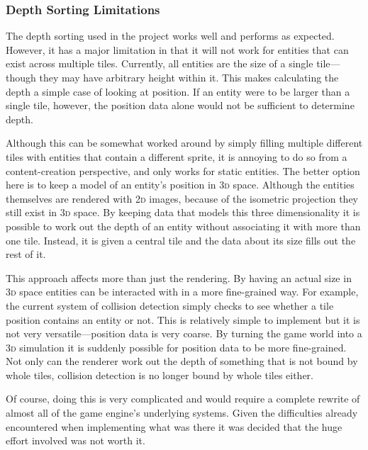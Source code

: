 \subsubsection{Depth Sorting Limitations}\label{depth_limits}
The depth sorting used in the project works well and performs as expected. However, it has a major limitation in that it will not work for entities that can exist across multiple tiles. Currently, all entities are the size of a single tile---though they may have arbitrary height within it. This makes calculating the depth a simple case of looking at position. If an entity were to be larger than a single tile, however, the position data alone would not be sufficient to determine depth.

Although this can be somewhat worked around by simply filling multiple different tiles with entities that contain a different sprite, it is annoying to do so from a content-creation perspective, and only works for static entities. The better option here is to keep a model of an entity's position in \textsc{3d} space. Although the entities themselves are rendered with \textsc{2d} images, because of the isometric projection they still exist in \textsc{3d} space. By keeping data that models this three dimensionality it is possible to work out the depth of an entity without associating it with more than one tile. Instead, it is given a central tile and the data about its size fills out the rest of it.

This approach affects more than just the rendering. By having an actual size in \textsc{3d} space entities can be interacted with in a more fine-grained way. For example, the current system of collision detection simply checks to see whether a tile position contains an entity or not. This is relatively simple to implement but it is not very versatile---position data is very coarse. By turning the game world into a \textsc{3d} simulation it is suddenly possible for position data to be more fine-grained. Not only can the renderer work out the depth of something that is not bound by whole tiles, collision detection is no longer bound by whole tiles either.

Of course, doing this is very complicated and would require a complete rewrite of almost all of the game engine's underlying systems. Given the difficulties already encountered when implementing what was there it was decided that the huge effort involved was not worth it.

